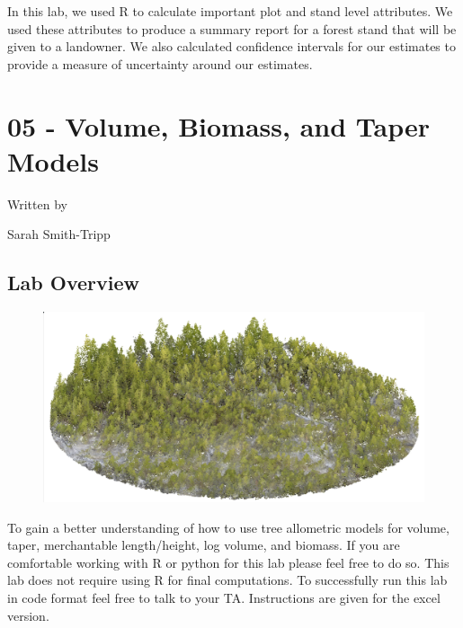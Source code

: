 \documentclass[
  letterpaper,
]{book}
\begin{document}

In this lab, we used R to calculate important plot and stand level
attributes. We used these attributes to produce a summary report for a
forest stand that will be given to a landowner. We also calculated
confidence intervals for our estimates to provide a measure of
uncertainty around our estimates.


\hypertarget{volume-biomass-and-taper-models}{%
\chapter{05 - Volume, Biomass, and Taper
Models}\label{volume-biomass-and-taper-models}}

Written by

Sarah Smith-Tripp

\hypertarget{lab-overview-4}{%
\section*{Lab Overview}\label{lab-overview-4}}


\begin{figure}

{\centering \includegraphics[width=5.3125in,height=\textheight]{images/clipboard-543746522.png}

}

\end{figure}

To gain a better understanding of how to use tree allometric models for
volume, taper, merchantable length/height, log volume, and biomass. If
you are comfortable working with R or python for this lab please feel
free to do so. This lab does not require using R for final computations.
To successfully run this lab in code format feel free to talk to your
TA. Instructions are given for the excel version.
\end{document}
